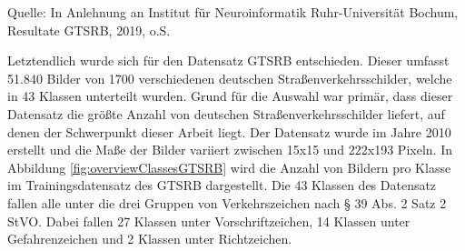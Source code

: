\begin{table}[t]
    
    \caption{Übersicht der fünf besten Einreichungen GTSRB Klassifizierung)\label{table:TopGTRSBPaper}}
    
    \hfill \break
    Quelle: In Anlehnung an Institut für Neuroinformatik Ruhr-Universität Bochum, Resultate GTSRB, 2019, o.S.
\end{table} 
Letztendlich wurde sich für den Datensatz \ac{GTSRB} entschieden. Dieser umfasst 51.840 Bilder von 1700 verschiedenen deutschen Straßenverkehrsschilder, welche in 43 Klassen unterteilt wurden. Grund für die Auswahl war primär, dass dieser Datensatz die größte Anzahl von deutschen Straßenverkehrsschilder liefert, auf denen  der Schwerpunkt dieser Arbeit liegt. Der Datensatz wurde im Jahre 2010 erstellt und die Maße der Bilder variiert zwischen 15x15 und 222x193 Pixeln. In Abbildung \ref{fig:overviewClassesGTSRB} wird die Anzahl von Bildern pro Klasse im Trainingsdatensatz des \ac{GTSRB} dargestellt. Die 43 Klassen des Datensatz fallen alle unter die drei Gruppen von Verkehrszeichen nach § 39 Abs. 2 Satz 2 \ac{StVO}. Dabei fallen 27 Klassen unter Vorschriftzeichen, 14 Klassen unter Gefahrenzeichen und 2 Klassen unter Richtzeichen. 

